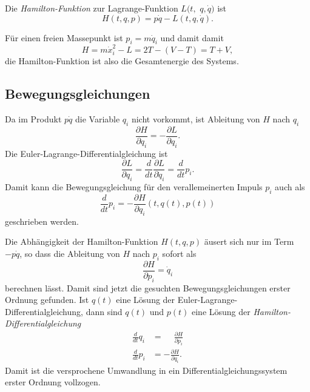 \begin{definition}
%
Die {\em Hamilton-Funktion} zur Lagrange-Funktion $L(t,$ $q,\dot{q})$ ist
\[
H(t,q,p)
=
p\dot{q}
-
L(t,q,\dot{q}).
\]
\end{definition}

Für einen freien Massepunkt ist $p_i = m\dot{q}_i$ und damit damit
\[
H=
m\dot{x}_i^2
-
L
=
2T
-
(V-T)
=
T+V,
\]
die Hamilton-Funktion ist also die Gesamtenergie des Systems.
%

%
%
\subsection{Bewegungsgleichungen}
Da im Produkt $p\dot{q}$ die Variable $q_i$ nicht vorkommt, ist
Ableitung von $H$ nach $q_i$
\[
\frac{\partial H}{\partial q_i}
=
-
\frac{\partial L}{\partial q_i}.
\]
Die Euler-Lagrange-Differentialgleichung ist
\[
\frac{\partial L}{\partial q_i}
=
\frac{d}{dt}\frac{\partial L}{\partial \dot{q}_i}
=
\frac{d}{dt} p_i.
\]
Damit kann die Bewegungsgleichung für den verallemeinerten Impuls $p_i$ auch als
\[
\frac{d}{dt}p_i
=
-
\frac{\partial H}{\partial q_i}(t,q(t),p(t))
\]
geschrieben werden.

Die Abhängigkeit der Hamilton-Funktion $H(t,q,p)$ äusert sich nur im Term
$-p\dot{q}$, so dass die Ableitung von $H$ nach $p_i$ sofort als
\[
\frac{\partial H}{\partial p_i}
=
\dot{q}_i
\]
berechnen lässt.
Damit sind jetzt die gesuchten Bewegungsgleichungen erster Ordnung gefunden.
Ist $q(t)$ eine Lösung der Euler-Lagrange-Differentialgleichung, dann sind
$q(t)$ und $p(t)$ eine Lösung der {\em Hamilton-Differentialgleichung}
\begin{align*}
\frac{d}{dt} q_i
&=
\phantom{-}\frac{\partial H}{\partial p_i}
\\
\frac{d}{dt} p_i
&=
-
\frac{\partial H}{\partial q_i}.
\end{align*}
Damit ist die versprochene Umwandlung in ein Differentialgleichungssystem
erster Ordnung vollzogen.


